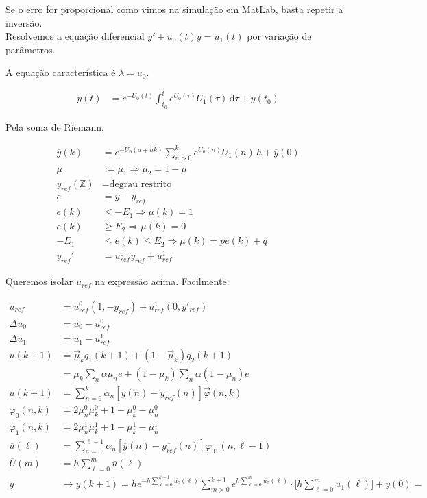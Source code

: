 \documentclass[11pt]{article}
\begin{document}
Se o erro for proporcional como vimos na simula\c{c}\~ao em MatLab, basta repetir a invers\~ao. \\

Resolvemos a equa\c{c}\~ao diferencial $y' + u_0(t) y = u_1(t)$ por varia\c{c}\~ao de par\^ametros.

A equa\c{c}\~ao caracter\'istica \'e $\lambda = u_0$.

\begin{align}
 y(t) &= e^{-U_0(t)} \int_{t_0}^t e^{U_0(\tau)} U_1(\tau)\, \mathrm{d}\tau + y(t_0)
\end{align}

Pela soma de Riemann,

\begin{align}
  \overline{y}(k) &= e^{-U_0(a + hk)} \sum_{n > 0}^k e^{U_0(n)} U_1(n)\, h + \overline{y}(0)  \\
  \mu &:= \mu_1 \Rightarrow \mu_2 = 1 - \mu \\
  y_{ref}(\mathbb{Z}) &= \text{degrau restrito} \\
  e &= y - y_{ref} \\
  e(k) &\le - E_1 \Rightarrow \mu(k) = 1 \\
  e(k) &\ge E_2 \Rightarrow \mu(k) = 0 \\
  - E_1 &\le e(k) \le E_2 \Rightarrow \mu(k) = p e(k) + q \\
  y_{ref}' &= u^0_{ref} y_{ref} + u^1_{ref}
  \end{align}

Queremos isolar $u_{ref}$ na express\~ao acima. Facilmente:

\begin{align}
  u_{ref} &= u^0_{ref}(1,-y_{ref}) + u^1_{ref}(0,y'_{ref}) \\
  \Delta u_0 &= u_0 - u^0_{ref} \\
  \Delta u_1 &= u_1 - u^1_{ref} \\
\overline{u}(k+1) &= \vec\mu_k q_1(k+1) + (1 - \vec\mu_k) q_2(k+1) \\
&= \mu_k \sum_n \alpha \mu_n e + (1 - \mu_k) \sum_n \alpha (1 - \mu_n) e \\
\overline{u}(k+1) &= \sum_{n = 0}^k \alpha_n  [\overline{y}(n) - \overline{y_{ref}}(n)] \vec\varphi(n,k) \\
\varphi_0(n, k) &= 2 \mu_n^0 \mu_k^0 + 1 - \mu_k^0 - \mu_n^0 \\
\varphi_1(n, k) &= 2 \mu_n^1 \mu_k^1 + 1 - \mu_k^1 - \mu_n^1 \\
\overline{u}(\ell) &= \sum_{n = 0}^{\ell - 1} \alpha_n [\overline{y}(n) - \overline{y_{ref}}(n)] \varphi_{01} (n, \ell-1) \\
\overline{U}(m) &= h \sum_{\ell = 0}^{m} \overline{u}(\ell) \\
\overline{y} &\to \overline{y}(k+ 1) = h e^{- h \sum_{\ell = 0}^{k+1} \overline{u_0}(\ell)} \sum_{m > 0}^{k+1} e^{h \sum_{\ell = 0}^{m} \overline{u_0}(\ell)} \cdot \bigg[ h \sum_{\ell = 0}^{m} \overline{u_1}(\ell) \bigg] + \overline{y}(0) = \nonumber
\end{align}
\end{document}
